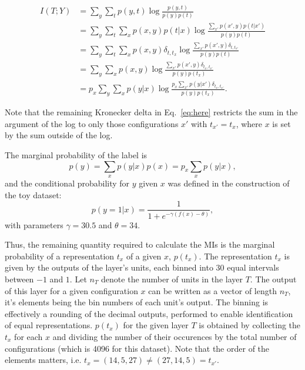 \documentclass[12pt]{report}
\begin{document}
\begin{align}
I(T;Y) &= \sum \limits_{y} \sum \limits_{t} p(y,t) \log\frac{p(y,t)}{p(y)p(t)}\\
&= \sum \limits_{y} \sum \limits_{t} \sum \limits_{x} p(x,y) p(t|x) \log\frac{ \sum \limits_{x'} p(x',y) p(t|x') }{p(y)p(t)}\\
&= \sum \limits_{y} \sum \limits_{t} \sum \limits_{x} p(x,y) \delta_{t,t_x} \log\frac{ \sum \limits_{x'} p(x',y) \delta_{t,t_{x'}} }{p(y)p(t)}\\
&= \sum \limits_{y} \sum \limits_{x} p(x,y) \log\frac{ \sum \limits_{x'} p(x',y) \delta_{t_x,t_{x'}} }{p(y)p(t_x)}\\
&= p_x \sum \limits_{y} \sum \limits_{x} p(y|x) \log\frac{ p_x \sum \limits_{x'} p(y|x') \delta_{t_x,t_{x'}} }{p(y)p(t_x)}. \label{eq:here}
\end{align}

Note that the remaining Kronecker delta in Eq.~\eqref{eq:here} restricts the sum in the argument of the log to only those configurations $x'$ with $t_{x'}=t_x$, where $x$ is set by the sum outside of the log.


The marginal probability of the label is
\begin{equation}
p(y) = \sum\limits_x p(y|x)p(x) = p_x \sum\limits_x p(y|x),
\end{equation}
and the conditional probability for $y$ given $x$ was defined in the construction of the toy dataset:
\begin{equation}
p(y=1|x) = \frac{1}{1+e^{-\gamma (f(x)-\theta)}},
\end{equation}
with parameters $\gamma = 30.5$ and $\theta=34$.

Thus, the remaining quantity required to calculate the MIs is the marginal probability of a representation $t_x$ of a given $x$, $p(t_x)$. The representation $t_x$ is given by the outputs of the layer's units, each binned into 30 equal intervals between $-1$ and $1$. Let $n_T$ denote the number of units in the layer $T$. The output of this layer for a given configuration $x$ can be written as a vector of length $n_T$, it's elements being the bin numbers of each unit's output. The binning is effectively a rounding of the decimal outputs, performed to enable identification of equal representations. $p(t_x)$ for the given layer $T$ is obtained by collecting the $t_x$ for each $x$ and dividing the number of their occurences by the total number of configurations (which is 4096 for this dataset). Note that the order of the elements matters, i.e. $t_x = (14, 5, 27) \neq (27, 14, 5) = t_{x'}$.
\end{document}
